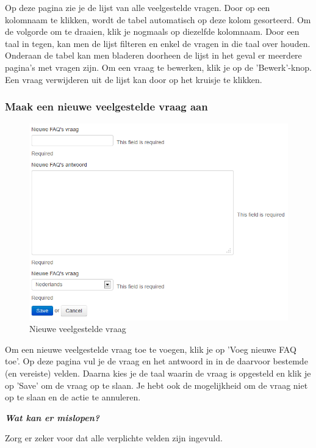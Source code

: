 \documentclass[]{article}
\begin{document}
Op deze pagina zie je de lijst van alle veelgestelde vragen. Door op een kolomnaam te klikken, wordt de tabel automatisch op deze kolom gesorteerd. Om de volgorde om te draaien, klik je nogmaals op diezelfde kolomnaam. Door een taal in tegen, kan men de lijst filteren en enkel de vragen in die taal over houden. Onderaan de tabel kan men bladeren doorheen de lijst in het geval er meerdere pagina's met vragen zijn. Om een vraag te bewerken, klik je op de 'Bewerk'-knop. Een vraag verwijderen uit de lijst kan door op het kruisje te klikken.

\subsubsection{Maak een nieuwe veelgestelde vraag aan}

\begin{figure}[!ht]
	\centering
	\includegraphics[width=1\textwidth]{img/new_faq}
	\caption{Nieuwe veelgestelde vraag}
	\label{new_faq}
\end{figure}

Om een nieuwe veelgestelde vraag toe te voegen, klik je op 'Voeg nieuwe FAQ toe'. Op deze pagina vul je de vraag en het antwoord in in de daarvoor bestemde (en vereiste) velden. Daarna kies je de taal waarin de vraag is opgesteld en klik je op 'Save' om de vraag op te slaan. Je hebt ook de mogelijkheid om de vraag niet op te slaan en de actie te annuleren.

\textbf{\textit{Wat kan er mislopen?}}

Zorg er zeker voor dat alle verplichte velden zijn ingevuld.
\end{document}
